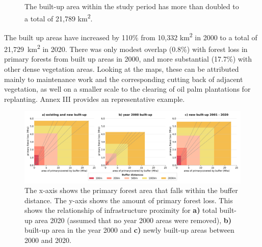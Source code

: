 \documentclass[
  letterpaper,
  DIV=11,
  numbers=noendperiod]{scrreprt}
\begin{document}
\begin{figure}
\begin{minipage}[t]{0.50\linewidth}
{{}

}

\end{minipage}%

\caption{\label{fig-forestloss_built_up}The built-up area within the
study period has more than doubled to a total of 21,789
km\textsuperscript{2}.}

\end{figure}

The built up areas have increased by 110\% from 10,332
km\textsuperscript{2} in 2000 to a total of 21,729~km\textsuperscript{2}
in 2020. There was only modest overlap (0.8\%) with forest loss in
primary forests from built up areas in 2000, and more substantial
(17.7\%) with other dense vegetation areas. Looking at the maps, these
can be attributed mainly to maintenance work and the corresponding
cutting back of adjacent vegetation, as well on a smaller scale to the
clearing of oil palm plantations for replanting. Annex III provides an
representative example.

\begin{figure}

{\centering \includegraphics{text/../code/results/final_plots/deforestation_buffer_primary_forest.png}

}

\caption{\label{fig-primary_buffer}The x-axis shows the primary forest
area that falls within the buffer distance. The y-axis shows the amount
of primary forest loss. This shows the relationship of infrastructure
proximity for \textbf{a)} total built-up area 2020 (assumed that no year
2000 areas were removed), \textbf{b)} built-up area in the year 2000 and
\textbf{c)} newly built-up areas between 2000 and 2020.}

\end{figure}
\end{document}
